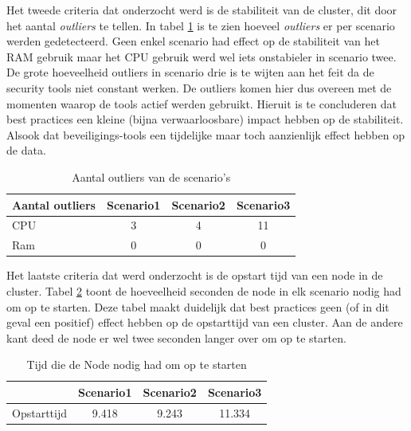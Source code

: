 Het tweede criteria dat onderzocht werd is de stabiliteit van de cluster, dit door het aantal \textit{outliers} te tellen. In tabel \ref{tab:Outliers} is te zien hoeveel \textit{outliers} er per scenario werden gedetecteerd. Geen enkel scenario had effect op de stabiliteit van het RAM gebruik maar het CPU gebruik werd wel iets onstabieler in scenario twee. De grote hoeveelheid outliers in scenario drie is te wijten aan het feit da de security tools niet constant werken. De outliers komen hier dus overeen met de momenten waarop de tools actief werden gebruikt. Hieruit is te concluderen dat best practices een kleine (bijna verwaarloosbare) impact hebben op de stabiliteit. Alsook dat beveiligings-tools een tijdelijke maar toch aanzienlijk effect hebben op de data.
%
\begin{table}[h]
	\centering
	\begin{tabular}{lccc}
		Aantal outliers & Scenario1 & Scenario2 & Scenario3 \\ \hline
		CPU             & 3         & 4         & 11        \\ \hline
		Ram             & 0         & 0         & 0        
	\end{tabular}
	\caption{Aantal outliers van de scenario's}
	\label{tab:Outliers}
\end{table}

Het laatste criteria dat werd onderzocht is de opstart tijd van een node in de cluster. Tabel \ref{tab:BootTime} toont de hoeveelheid seconden de node in elk scenario nodig had om op te starten. Deze tabel maakt duidelijk dat best practices geen (of in dit geval een positief) effect hebben op de opstarttijd van een cluster. Aan de andere kant deed de node er wel twee seconden langer over om op te starten. 

\begin{table}[h]
	\centering
	\begin{tabular}{lccc}
		& Scenario1 & Scenario2 & Scenario3 \\ \hline
		Opstarttijd & 9.418     & 9.243     & 11.334   
	\end{tabular}
	\caption{Tijd die de Node nodig had om op te starten}
	\label{tab:BootTime}
\end{table}


